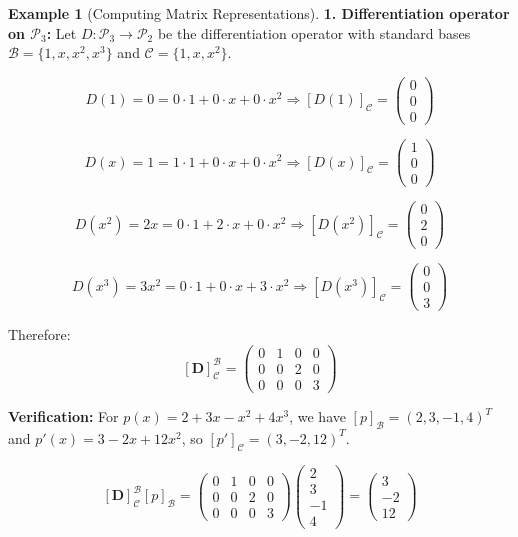 \documentclass[12pt]{article}
\numberwithin{equation}{section}
\newcommand{\mat}[1]{\mathbf{#1}}        %
\theoremstyle{plain}
\theoremstyle{definition}
\newtheorem{example}[theorem]{Example}
\theoremstyle{remark}
\begin{document}
\begin{example}[Computing Matrix Representations]
\textbf{1. Differentiation operator on $\mathcal{P}_3$:}
Let $D: \mathcal{P}_3 \to \mathcal{P}_2$ be the differentiation operator with standard bases $\mathcal{B} = \{1, x, x^2, x^3\}$ and $\mathcal{C} = \{1, x, x^2\}$.

$$D(1) = 0 = 0 \cdot 1 + 0 \cdot x + 0 \cdot x^2 \Rightarrow [D(1)]_{\mathcal{C}} = \begin{pmatrix} 0 \\ 0 \\ 0 \end{pmatrix}$$

$$D(x) = 1 = 1 \cdot 1 + 0 \cdot x + 0 \cdot x^2 \Rightarrow [D(x)]_{\mathcal{C}} = \begin{pmatrix} 1 \\ 0 \\ 0 \end{pmatrix}$$

$$D(x^2) = 2x = 0 \cdot 1 + 2 \cdot x + 0 \cdot x^2 \Rightarrow [D(x^2)]_{\mathcal{C}} = \begin{pmatrix} 0 \\ 2 \\ 0 \end{pmatrix}$$

$$D(x^3) = 3x^2 = 0 \cdot 1 + 0 \cdot x + 3 \cdot x^2 \Rightarrow [D(x^3)]_{\mathcal{C}} = \begin{pmatrix} 0 \\ 0 \\ 3 \end{pmatrix}$$

Therefore:
$$[\mat{D}]_{\mathcal{C}}^{\mathcal{B}} = \begin{pmatrix} 0 & 1 & 0 & 0 \\ 0 & 0 & 2 & 0 \\ 0 & 0 & 0 & 3 \end{pmatrix}$$

\textbf{Verification:} For $p(x) = 2 + 3x - x^2 + 4x^3$, we have $[p]_{\mathcal{B}} = (2, 3, -1, 4)^T$ and $p'(x) = 3 - 2x + 12x^2$, so $[p']_{\mathcal{C}} = (3, -2, 12)^T$.

$$[\mat{D}]_{\mathcal{C}}^{\mathcal{B}} [p]_{\mathcal{B}} = \begin{pmatrix} 0 & 1 & 0 & 0 \\ 0 & 0 & 2 & 0 \\ 0 & 0 & 0 & 3 \end{pmatrix} \begin{pmatrix} 2 \\ 3 \\ -1 \\ 4 \end{pmatrix} = \begin{pmatrix} 3 \\ -2 \\ 12 \end{pmatrix}$$ \checkmark
\end{example}
\end{document}
